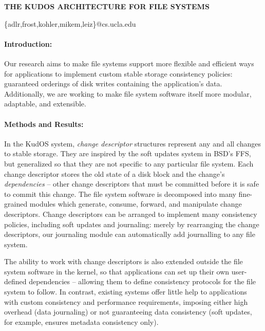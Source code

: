 \documentclass[12pt]{article}
\newcommand{\preparagraphspacing}{\vspace{-0.2in}}
\begin{document}
\noindent\textbf{THE KUDOS ARCHITECTURE FOR FILE SYSTEMS}


\noindent \{adlr,frost,kohler,mikem,leiz\}@cs.ucla.edu


\preparagraphspacing
\paragraph{Introduction:}

Our research aims to make file systems support more flexible and efficient ways
for applications to implement custom stable storage consistency policies:
guaranteed orderings of disk writes containing the application's data.
Additionally, we are working to make file system software itself more modular,
adaptable, and extensible.

\preparagraphspacing
\paragraph{Methods and Results:}

In the KudOS system, \emph{change descriptor} structures represent any and all
changes to stable storage. They are inspired by the soft updates system in BSD's
FFS, but generalized so that they are not specific to any particular file
system. Each change descriptor stores the old state of a disk block and the
change's \emph{dependencies} -- other change descriptors that must be committed
before it is safe to commit this change. The file system software is decomposed
into many fine-grained modules which generate, consume, forward, and manipulate
change descriptors. Change descriptors can be arranged to implement many
consistency policies, including soft updates and journaling: merely by
rearranging the change descriptors, our journaling module can automatically add
journalling to any file system.

The ability to work with change descriptors is also extended outside the file
system software in the kernel, so that applications can set up their own
user-defined dependencies -- allowing them to define consistency protocols for
the file system to follow. In contrast, existing systems offer little help to
applications with custom consistency and performance requirements, imposing
either high overhead (data journaling) or not guaranteeing data consistency
(soft updates, for example, ensures metadata consistency only).
\end{document}
